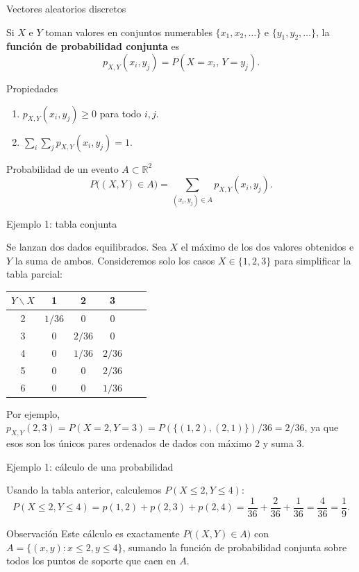 \documentclass[aspectratio=169,11pt]{beamer}
\begin{document}
\begin{frame}{Vectores aleatorios discretos}
\begin{definition}
Si $X$ e $Y$ toman valores en conjuntos numerables $\{x_1, x_2, \ldots\}$ e $\{y_1, y_2, \ldots\}$, la \textbf{función de probabilidad conjunta} es
\[
p_{X,Y}(x_i, y_j) = P(X = x_i, \, Y = y_j).
\]
\end{definition}
\begin{block}{Propiedades}
\begin{enumerate}
\item $p_{X,Y}(x_i,y_j) \ge 0$ para todo $i,j$.
\item $\displaystyle\sum_i \sum_j p_{X,Y}(x_i,y_j) = 1$.
\end{enumerate}
\end{block}
\begin{block}{Probabilidad de un evento $A \subset \mathbb{R}^2$}
\[
P\big((X,Y) \in A\big) = \sum_{(x_i,y_j) \in A} p_{X,Y}(x_i,y_j).
\]
\end{block}
\end{frame}

\begin{frame}{Ejemplo 1: tabla conjunta}
\begin{example}
Se lanzan dos dados equilibrados. Sea $X$ el máximo de los dos valores obtenidos e $Y$ la suma de ambos. Consideremos solo los casos $X \in \{1,2,3\}$ para simplificar la tabla parcial:

\begin{table}[]
\centering
\begin{tabular}{c|ccccc}
\toprule
$Y \backslash X$ & 1 & 2 & 3 \\
\midrule
2 & $1/36$ & 0 & 0 \\
3 & 0 & $2/36$ & 0 \\
4 & 0 & $1/36$ & $2/36$ \\
5 & 0 & 0 & $2/36$ \\
6 & 0 & 0 & $1/36$ \\
\bottomrule
\end{tabular}
\end{table}
Por ejemplo, $p_{X,Y}(2,3) = P(X=2, Y=3) = P(\{(1,2),(2,1)\})/36 = 2/36$, ya que esos son los únicos pares ordenados de dados con máximo 2 y suma 3.
\end{example}
\end{frame}

\begin{frame}{Ejemplo 1: cálculo de una probabilidad}
\begin{example}
Usando la tabla anterior, calculemos $P(X \le 2, Y \le 4)$:
\[
P(X\le 2, Y\le 4) = p(1,2) + p(2,3) + p(2,4) = \frac{1}{36} + \frac{2}{36} + \frac{1}{36} = \frac{4}{36} = \frac{1}{9}.
\]
\end{example}
\pause
\begin{block}{Observación}
Este cálculo es exactamente $P\big((X,Y) \in A\big)$ con $A = \{(x,y) : x\le 2, y \le 4\}$, sumando la función de probabilidad conjunta sobre todos los puntos de soporte que caen en $A$.
\end{block}
\end{frame}
\end{document}
